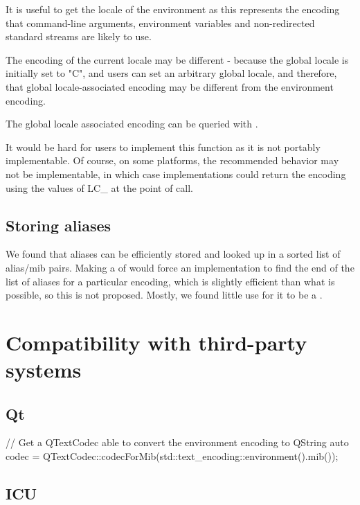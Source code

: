 \documentclass{wg21}
\begin{document}
It is useful to get the locale of the environment as this represents the encoding that command-line arguments,
environment variables and non-redirected standard streams are likely to use.

The encoding of the current locale may be different - because the global locale is initially set to "C", and users can set an arbitrary global locale, and therefore, that global locale-associated encoding may be different from the environment encoding.

The global locale associated encoding can be queried with .

It would be hard for users to implement this function as it is not portably implementable.
Of course, on some platforms, the recommended behavior may not be implementable, in which case implementations could return
the encoding using the values of LC_ at the point of call.

\subsection{Storing aliases}

We found that aliases can be efficiently stored and looked up in a sorted list of alias/mib pairs.
Making a  of  would force an implementation to find the end of the list
of aliases for a particular encoding, which is slightly efficient than what is possible, so this is not proposed.
Mostly, we found little use for it to be a .

\section{Compatibility with third-party systems}

\subsection{Qt}

\begin{colorblock}
// Get a QTextCodec able to convert the environment encoding to QString
auto codec = QTextCodec::codecForMib(std::text_encoding::environment().mib());
\end{colorblock}

\subsection{ICU}
\end{document}
